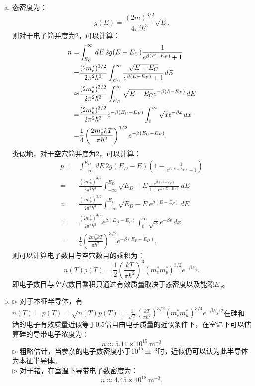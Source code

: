 \documentclass[reqno,a4paper,12pt]{amsart}
\begin{document}
\begin{enumerate}[1.]
\begin{figure}[h]
\end{figure}
\begin{tcolorbox}[breakable, colback = black!5!white, colframe = black]
\begin{enumerate}[(a)]
\item 态密度为：
\[
	g(E) = \frac{(2m)^{3/2}}{4\pi^2\hbar^3} \sqrt{E}.
\]
则对于电子简并度为2，可以计算：
\begin{align*}
	n =& \int_{E_C}^\infty \,dE\, 2g(E-E_C) \frac{1}{e^{\beta(E-E_F)}+1} \\
	=& \frac{(2m_e^*)^{3/2}}{2\pi^2\hbar^3} \int_{E_C}^\infty \cfrac{\sqrt{E-E_C}}{e^{\beta(E-E_F)}+1} \,dE \\
	\approx& \frac{(2m_e^*)^{3/2}}{2\pi^2\hbar^3} \int_{E_C}^\infty \sqrt{E-E_C} e^{-\beta(E-E_F)} \,dE \\
	=& \frac{(2m_e^*)^{3/2}}{2\pi^2\hbar^3} e^{-\beta(E_C-E_F)} \int_0^\infty \sqrt{x}e^{-\beta x} \,dx \\
	=& \frac{1}{4}\left( \frac{2m_e^*kT}{\pi\hbar^2} \right)^{3/2} e^{-\beta(E_C-E_F)}.
\end{align*}
类似地，对于空穴简并度为2，可以计算：
\begin{align*}
	p =& \int_{-\infty}^{E_D} \,dE\, 2g(E_D-E) \left( 1 - \frac{1}{e^{\beta(E-E_F)} + 1} \right) \\
	=& \frac{(2m_p^*)^{3/2}}{2\pi^2\hbar^3} \int_{-\infty}^{E_D} \sqrt{E_D - E} \frac{e^{\beta(E-E_F)}}{1+e^{\beta(E-E_F)}} \,dE \\
	\approx& \frac{(2m_p^*)^{3/2}}{2\pi^2\hbar^3} \int_{-\infty}^{E_D} \sqrt{E_D-E} e^{\beta(E-E_F)} \,dE \\
	=& \frac{(2m_p^*)^{3/2}}{2\pi^2\hbar^3} e^{\beta(E_D - E_F)} \int_0^\infty \sqrt{x} e^{-\beta x} \,dx \\
	=& \frac{1}{4} \left( \frac{2m_p^*kT}{\pi\hbar^2} \right)^{3/2} e^{-\beta(E_F - E_D)}.
\end{align*}
则可以计算电子数目与空穴数目的乘积为：
\[
	n(T) p(T) = \frac{1}{2}\left( \frac{kT}{\pi\hbar^2} \right)^{3} (m_e^*m_p^*)^{3/2} e^{-\beta E_g}.
\]
即电子数目与空穴数目乘积只通过有效质量取决于态密度以及能隙$E_g$。

\item 
$\triangleright$ 对于本征半导体，有$n(T) = p(T) = \sqrt{n(T)p(T)} = \frac{1}{\sqrt{2}} \left( \frac{kT}{\pi\hbar^2} \right)^{3/2} (m_e^*m_h^*)^{3/4}e^{-\beta E_g/2}$在硅和锗的电子有效质量近似等于$0.5$倍自由电子质量的近似条件下，在室温下可以估算硅的导带电子浓度为：
\[
	n \approx 5.11 \times 10^{15} ~ \text{m}^{-3}
\]
$\triangleright$ 粗略估计，当参杂的电子数密度小于$10^{15}~\text{m}^{-3}$时，近似仍可以认为此半导体为本征半导体。 \\
$\triangleright$ 对于锗，在室温下导带电子数密度为：
\[
	n \approx 4.45 \times 10^{18} ~ \text{m}^{-3}.
\]


\end{enumerate}
\end{tcolorbox}
\end{enumerate}
\end{document}
